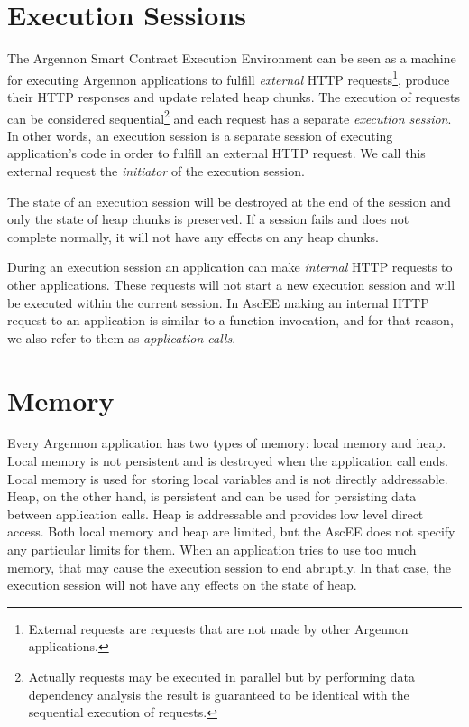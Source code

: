 \section{Execution Sessions}\label{sec:sessions}

The Argennon Smart Contract Execution Environment can be seen as a machine for executing Argennon applications to
fulfill \emph{external} HTTP requests\footnote{External requests are requests that are not made by other Argennon
applications.}, produce their HTTP responses and update related heap chunks. The execution of requests can be
considered sequential\footnote{Actually requests may be executed in parallel but by performing data dependency analysis
the result is guaranteed to be identical with the sequential execution of requests.} and each request has a separate
\emph{execution session}. In other words, an execution session is a separate session of executing application's code in
order to fulfill an external HTTP request. We call this external request the \emph{initiator} of the execution session.

The state of an execution session will be
destroyed at the end of the session and only the state of heap chunks is preserved. If a session fails and does not
complete normally, it will not have any effects on any heap chunks.

During an execution session an application can make \emph{internal} HTTP requests to other applications. These
requests will not start a new execution session and will be executed within the current session. In AscEE making an
internal HTTP request to an application is similar to a function invocation, and for that reason, we also refer to
them as \emph{application calls}.


\section{Memory}\label{mem}

Every Argennon application has two types of memory: local memory and heap. Local memory is not persistent and is
destroyed when the application call ends. Local memory is used for storing local variables and is not directly
addressable. Heap, on the other hand, is persistent and can be used for persisting data between application calls.
Heap is addressable and provides low level direct access. Both local memory and heap are limited, but the
AscEE does not specify any particular limits for them. When an application tries to use too much memory, that may
cause the execution session to end abruptly. In that case, the execution session will not have any effects on the
state of heap.

